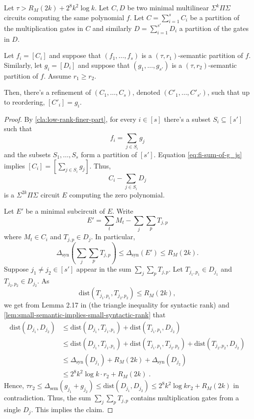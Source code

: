 \documentclass[12pt]{article}
\newcommand{\Sps}[1]{\Sigma^{#1} \Pi\Sigma}
\newcommand{\ranksyn}{\Delta_{\text{syn}}}
\newcommand{\dist}{\text{dist}}
\newcommand{\ranksem}{\Delta_{\text{sem}}}
\begin{document}
	\begin{lemma}\label{lem:lower-rank-finer-partition}
		Let $\tau > R_M(2k) + 2^8 k^2 \log k$.
		Let $C, D$ be two minimal multilinear $\Sps{k}$ circuits computing the same polynomial $f$. Let $C=\sum_{i=1}^{s}C_i$ be a partition of the multiplication gates in $C$ and similarly $D=\sum_{i=1}^{s'}D_i$ a partition of the gates in $D$.
		
		Let $f_i = [C_i]$ and suppose that $(f_1, \ldots, f_s)$ is a $(\tau,r_1)$-semantic partition of $f$. Similarly, let $g_i = [D_i]$ and suppose that $(g_1, \ldots, g_{s'})$ is a $(\tau, r_2)$-semantic partition of $f$. Assume $r_1 \ge r_2$.
		
		Then, there's a refinement of $(C_1, \ldots, C_s)$, denoted $(C'_1, \ldots, C'_{s'})$, such that up to reordering, $[C'_i] = g_i$. 
	\end{lemma}
	
	\begin{proof}
		By \autoref{cla:low-rank-finer-part}, for every $i \in [s]$ there's a subset $S_i \subseteq [s']$ such that
		\begin{equation}
			\label{eq:fi-sum-of-g_js}
			f_i = \sum_{j \in S_i} g_j
		\end{equation}
		and the subsets $S_1, \ldots, S_s$ form a partition of $[s']$.
		Equation \eqref{eq:fi-sum-of-g_js} implies $[C_i] = [\sum_{j \in S_i} g_j]$. Thus,
		\[
		C_i - \sum_{j \in S_i} D_j
		\]
		is a $\Sps{2k}$ circuit $E$ computing the zero polynomial.
		
		Let $E'$ be a minimal subcircuit of $E$. Write
		\[
		E' = \sum_t M_t - \sum_{j} \sum_p T_{j,p}
		\]
		where $M_t \in C_i$ and $T_{j,p} \in D_j$. In particular,
		\[
		\ranksyn(\sum_j \sum_p T_{j,p}) \le \ranksyn(E') \le R_M(2k).
		\]
		Suppose $j_1\neq j_2 \in [s']$ appear in the sum $\sum_j \sum_p T_{j,p}$. Let $T_{j_1,p_1} \in D_{j_1}$ and $T_{j_2,p_2} \in D_{j_2}$. As
		\[
		\dist(T_{j_1,p_1}, T_{j_2,p_2}) \le R_M(2k),
		\]
		we get from Lemma 2.17 in \cite{KarninShpilka09} (the triangle inequality for syntactic rank) and \autoref{lem:small-semantic-implies-small-syntactic-rank}  that 
		\begin{align*}
			\dist(D_{j_1}, D_{j_2}) &\le \dist(D_{j_1}, T_{j_1,p_1}) +\dist(T_{j_1,p_1}, D_{j_2})\\ &\leq \dist(D_{j_1}, T_{j_1,p_1}) +\dist(T_{j_1,p_1}, T_{j_2,p_2}) + \dist(T_{j_2,p_2}, D_{j_2})\\ &\le \ranksyn(D_{j_1}) +R_M(2k) + \ranksyn(D_{j_2})\\ &\le 2^8 k^2 \log k \cdot r_2 + R_M(2k)\;.
		\end{align*}
		Hence, $\tau r_2 \le \ranksem(g_{j_1} + g_{j_2}) \le \dist(D_{j_1}, D_{j_2})\le 2^8 k^2 \log k r_2 + R_M(2k) $ in contradiction. Thus, the sum $\sum_j \sum_p T_{j,p}$ contains multiplication gates from a single $D_j$. This implies the claim.
	\end{proof}
	
\end{document}
